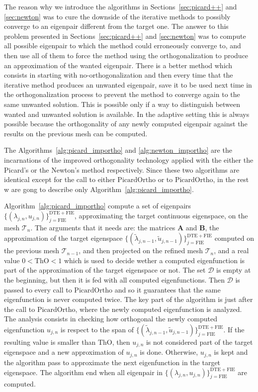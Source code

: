 \documentclass[preprint,12pt]{elsarticle}
\newcommand{\cT}{\mathcal{T}}
\begin{document}
The reason why we introduce the algorithms in Sections~\ref{sec:picard++} and \ref{sec:newton} was to cure the downside of the iterative methods to possibly converge to an eigenpair different from the target one. The answer to this problem presented in Sections~\ref{sec:picard++} and \ref{sec:newton} was to compute all possible eigenpair to which the method could erroneously converge to, and then use all of them to force the method using the orthogonalization to produce an approximation of the wanted eigenpair. There is a better method which consists in starting with no-orthogonalization and then every time that the iterative method produces an unwanted eigenpair, save it to be used next time in the orthogonalization process to prevent the method to converge again to the same unwanted solution. This is possible only if a way to distinguish between wanted and unwanted solution is available. In the adaptive setting this is always possible because  the orthogonality of any newly computed eigenpair against the results on the previous mesh can be computed.

The Algorithms~\ref{alg:picard_importho} and \ref{alg:newton_importho} are the incarnations of the improved orthogonality technology applied with the either the Picard's or the Newton's method respectively. Since these two algorithms are identical except for the call to either $\mathrm{PicardOrtho}$ or to $\mathrm{PicardOrtho}$, in the rest w are gong to describe only Algorithm~\ref{alg:picard_importho}.

Algorithm~\ref{alg:picard_importho} compute a set of eigenpairs $\{(\lambda_{j,n},u_{j,n})\}_{j=\mathrm{FIE}}^{\mathrm{DTE}+\mathrm{FIE}}$, approximating the target continuous eigenspace, on the mesh $\cT_n$. The arguments that it needs are: the matrices $\mathbf{A}$ and $\mathbf{B}$, the approximation of the target eigenspace $\{(\tilde\lambda_{j,n-1},\tilde u_{j,n-1})\}_{j=\mathrm{FIE}}^{\mathrm{DTE}+\mathrm{FIE}}$ computed on the previous mesh $\cT_{n-1}$, and then projected on the refined mesh $\cT_n$, and a real value $0<\mathrm{ThO}<1$ which is used to decide wether a computed eigenfunction is part of the approximation of the target eigenspace or not. The set $\mathcal{D}$ is empty at the beginning, but then it is fed with all computed eigenfunctions. Then $\mathcal{D}$ is passed to every call to $\mathrm{PicardOrtho}$ and so it guarantees that the same eigenfunction is never computed twice.
The key part of the algorithm is just after the call to $\mathrm{PicardOrtho}$, where the newly computed eigenfunction is analyzed. The analysis consists in checking how orthogonal the newly computed eigenfunction $u_{j,n}$ is respect to the span of $\{(\tilde\lambda_{j,n-1},\tilde u_{j,n-1})\}_{j=\mathrm{FIE}}^{\mathrm{DTE}+\mathrm{FIE}}$. If the resulting value is smaller than $\mathrm{ThO}$, then $u_{j,n}$ is not considered part of the target eigenspace and a new approximation of  $u_{j,n}$ is done. Otherwise, $u_{j,n}$ is kept and the algorithm pass to approximate the next eigenfunction in the target eigenspace.
The algorithm end when all eigenpair in $\{(\lambda_{j,n},u_{j,n})\}_{j=\mathrm{FIE}}^{\mathrm{DTE}+\mathrm{FIE}}$ are computed.
\end{document}

